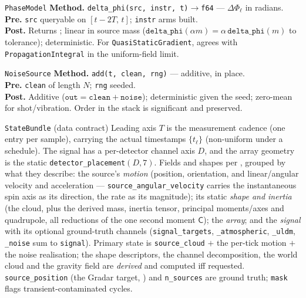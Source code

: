 \documentclass[11pt,a4paper]{article}
\theoremstyle{reqstyle}
\begin{document}
\begin{contractbox}{\texttt{PhaseModel}}
\textbf{Method.} \texttt{delta\_phi(src, instr, t)$\to$f64} --- $\Delta\Phi_\ell$ in radians.\\
\textbf{Pre.} \texttt{src} queryable on $[t-2T,\,t]$; \texttt{instr} arms built.\\
\textbf{Post.} Returns ; linear in source mass
($\texttt{delta\_phi}(\alpha m)=\alpha\,\texttt{delta\_phi}(m)$ to tolerance); deterministic.
For \texttt{QuasiStaticGradient}, agrees with \texttt{PropagationIntegral} in the
uniform-field limit.
\end{contractbox}

\begin{contractbox}{\texttt{NoiseSource}}
\textbf{Method.} \texttt{add(t, clean, rng)} --- additive, in place.\\
\textbf{Pre.} \texttt{clean} of length $N$; \texttt{rng} seeded.\\
\textbf{Post.} Additive ($\texttt{out}=\texttt{clean}+\texttt{noise}$); deterministic given
the seed; zero-mean for shot/vibration. Order in the stack is significant and preserved.
\end{contractbox}

\begin{contractbox}{\texttt{StateBundle} (data contract)}
Leading axis $T$ is the measurement cadence (one entry per sample), carrying the actual
timestamps $\{t_\ell\}$ (non-uniform under a schedule). The signal has a per-detector channel
axis $D$, and the array geometry is the static \texttt{detector\_placement}$(D,7)$. Fields and
shapes per , grouped by what they describe: the source's \emph{motion}
(position, orientation, and linear/angular velocity and acceleration --- \texttt{source\_angular\_velocity}
carries the instantaneous spin axis as its direction, the rate as its magnitude); its static
\emph{shape and inertia} (the cloud, plus the derived mass, inertia tensor, principal moments/axes
and quadrupole, all reductions of the one second moment $\mathsf C$); the \emph{array}; and the
\emph{signal} with its optional ground-truth channels (\texttt{signal\_targets}, \texttt{\_atmospheric},
\texttt{\_uldm}, \texttt{\_noise} sum to \texttt{signal}). Primary state is \texttt{source\_cloud}
$+$ the per-tick motion $+$ the noise realisation; the shape descriptors, the channel decomposition,
the world cloud and the gravity field are \emph{derived} and computed iff requested.
\texttt{source\_position} (the Gradar target, ) and \texttt{n\_sources} are ground
truth; \texttt{mask} flags transient-contaminated cycles.
\end{contractbox}
\end{document}
